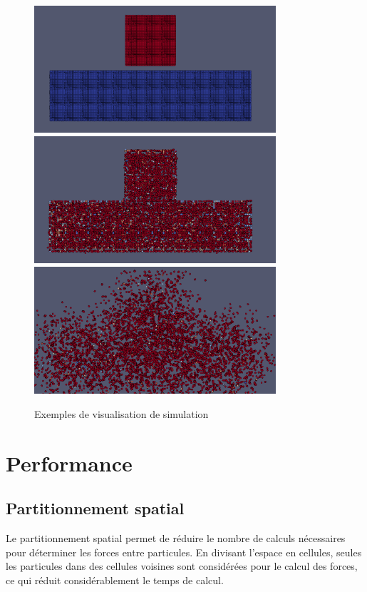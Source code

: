 \documentclass[12pt,a4paper]{article}
\begin{document}
\begin{figure}[H]
\centering
\includegraphics[width=0.8\textwidth]{assets/visu1.png}
\includegraphics[width=0.8\textwidth]{assets/visu2.png}
\includegraphics[width=0.8\textwidth]{assets/visu3.png}
\caption{Exemples de visualisation de simulation}
\end{figure}

\section{Performance}

\subsection{Partitionnement spatial}

Le partitionnement spatial permet de réduire le nombre de calculs nécessaires pour déterminer les forces entre particules. En divisant l'espace en cellules, seules les particules dans des cellules voisines sont considérées pour le calcul des forces, ce qui réduit considérablement le temps de calcul.
\end{document}
